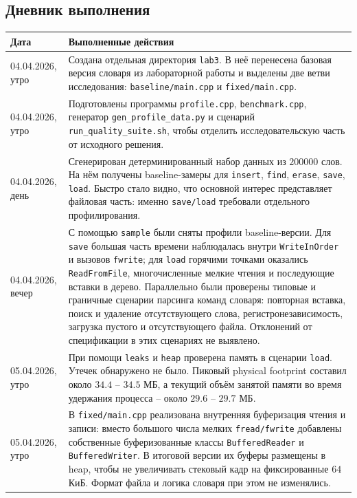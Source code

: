 \subsection{Дневник выполнения}

\begin{longtable}{|p{}|p{}|}
\hline
Дата & Выполненные действия \\
\hline
04.04.2026, утро &
Создана отдельная директория \texttt{lab3}. В неё перенесена базовая версия словаря из лабораторной работы \textnumero 2 и выделены две ветви исследования: \texttt{baseline/main.cpp} и \texttt{fixed/main.cpp}. \\
\hline

04.04.2026, утро &
Подготовлены программы \texttt{profile.cpp}, \texttt{benchmark.cpp}, генератор \texttt{gen\_profile\_data.py} и сценарий \texttt{run\_quality\_suite.sh}, чтобы отделить исследовательскую часть от исходного решения. \\
\hline

04.04.2026, день &
Сгенерирован детерминированный набор данных из \(200000\) слов. На нём получены baseline-замеры для \texttt{insert}, \texttt{find}, \texttt{erase}, \texttt{save}, \texttt{load}. Быстро стало видно, что основной интерес представляет файловая часть: именно \texttt{save/load} требовали отдельного профилирования. \\
\hline

04.04.2026, вечер &
С помощью \texttt{sample} были сняты профили baseline-версии. Для \texttt{save} большая часть времени наблюдалась внутри \texttt{WriteInOrder} и вызовов \texttt{fwrite}; для \texttt{load} горячими точками оказались \texttt{ReadFromFile}, многочисленные мелкие чтения и последующие вставки в дерево. Параллельно были проверены типовые и граничные сценарии парсинга команд словаря: повторная вставка, поиск и удаление отсутствующего слова, регистронезависимость, загрузка пустого и отсутствующего файла. Отклонений от спецификации в этих сценариях не выявлено. \\
\hline

05.04.2026, утро &
При помощи \texttt{leaks} и \texttt{heap} проверена память в сценарии \texttt{load}. Утечек обнаружено не было. Пиковый physical footprint составил около \(34.4\) -- \(34.5\) МБ, а текущий объём занятой памяти во время удержания процесса -- около \(29.6\) -- \(29.7\) МБ. \\
\hline

05.04.2026, утро &
В \texttt{fixed/main.cpp} реализована внутренняя буферизация чтения и записи: вместо большого числа мелких \texttt{fread/fwrite} добавлены собственные буферизованные классы \texttt{BufferedReader} и \texttt{BufferedWriter}. В итоговой версии их буферы размещены в heap, чтобы не увеличивать стековый кадр на фиксированные \(64\) КиБ. Формат файла и логика словаря при этом не изменялись. \\
\hline


\end{longtable}
